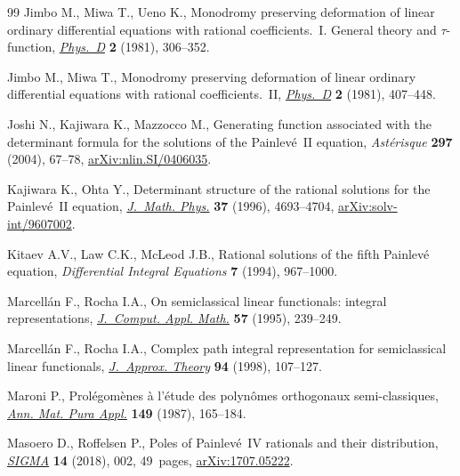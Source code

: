 \documentclass[pdftex]{sigma}
\numberwithin{equation}{section}
\theoremstyle{definition}
\begin{document}
\begin{thebibliography}{99}
Jimbo M., Miwa T., Ueno K., Monodromy preserving deformation of linear ordinary
 differential equations with rational coefficients.~{I}. {G}eneral theory and
 {$\tau $}-function,
 \href{https://doi.org/10.1016/0167-2789(81)90013-0}{\textit{Phys.~D}}
 \textbf{2} (1981), 306--352.

Jimbo M., Miwa T., Monodromy preserving deformation of linear ordinary
 differential equations with rational coefficients.~{II},
 \href{https://doi.org/10.1016/0167-2789(81)90021-X}{\textit{Phys.~D}}
 \textbf{2} (1981), 407--448.

Joshi N., Kajiwara K., Mazzocco M., Generating function associated with the
 determinant formula for the solutions of the {P}ainlev\'e~{II} equation,
 \textit{Ast\'erisque} \textbf{297} (2004), 67--78,
 \href{http://arxiv.org/abs/nlin.SI/0406035}{arXiv:nlin.SI/0406035}.

Kajiwara K., Ohta Y., Determinant structure of the rational solutions for the
 {P}ainlev\'e~{II} equation,
 \href{https://doi.org/10.1063/1.531648}{\textit{J.~Math. Phys.}} \textbf{37}
 (1996), 4693--4704,
 \href{http://arxiv.org/abs/solv-int/9607002}{arXiv:solv-int/9607002}.

Kitaev A.V., Law C.K., McLeod J.B., Rational solutions of the fifth
 {P}ainlev\'e equation, \textit{Differential Integral Equations} \textbf{7}
 (1994), 967--1000.

Marcell\'an F., Rocha I.A., On semiclassical linear functionals: integral
 representations,
 \href{https://doi.org/10.1016/0377-0427(93)E0248-K}{\textit{J.~Comput. Appl.
 Math.}} \textbf{57} (1995), 239--249.

Marcell\'an F., Rocha I.A., Complex path integral representation for
 semiclassical linear functionals,
 \href{https://doi.org/10.1006/jath.1998.3190}{\textit{J.~Approx. Theory}}
 \textbf{94} (1998), 107--127.

Maroni P., Prol\'egom\`enes \`a l'\'etude des polyn\^{o}mes orthogonaux
 semi-classiques, \href{https://doi.org/10.1007/BF01773932}{\textit{Ann. Mat.
 Pura Appl.}} \textbf{149} (1987), 165--184.

Masoero D., Roffelsen P., Poles of {P}ainlev\'e~{IV} rationals and their
 distribution, \href{https://doi.org/10.3842/SIGMA.2018.002}{\textit{SIGMA}}
 \textbf{14} (2018), 002, 49~pages,
 \href{http://arxiv.org/abs/1707.05222}{arXiv:1707.05222}.


\end{thebibliography}
\end{document}
